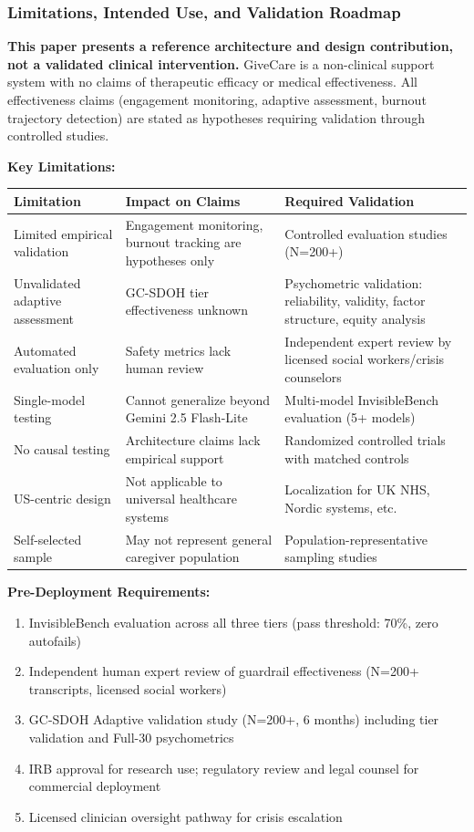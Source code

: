 \documentclass{article}
\begin{document}
\subsubsection{Limitations, Intended Use, and Validation Roadmap}
\textbf{This paper presents a reference architecture and design contribution, not a validated clinical intervention.} GiveCare is a non-clinical support system with no claims of therapeutic efficacy or medical effectiveness. All effectiveness claims (engagement monitoring, adaptive assessment, burnout trajectory detection) are stated as hypotheses requiring validation through controlled studies.

\textbf{Key Limitations:}

\small
\begin{table}[h]
\centering
\begin{tabular}{p{3.5cm}p{5cm}p{5cm}}
\toprule
\textbf{Limitation} & \textbf{Impact on Claims} & \textbf{Required Validation} \\
\midrule
Limited empirical validation & Engagement monitoring, burnout tracking are hypotheses only & Controlled evaluation studies (N=200+) \\
\midrule
Unvalidated adaptive assessment & GC-SDOH tier effectiveness unknown & Psychometric validation: reliability, validity, factor structure, equity analysis \\
\midrule
Automated evaluation only & Safety metrics lack human review & Independent expert review by licensed social workers/crisis counselors \\
\midrule
Single-model testing & Cannot generalize beyond Gemini 2.5 Flash-Lite & Multi-model InvisibleBench evaluation (5+ models) \\
\midrule
No causal testing & Architecture claims lack empirical support & Randomized controlled trials with matched controls \\
\midrule
US-centric design & Not applicable to universal healthcare systems & Localization for UK NHS, Nordic systems, etc. \\
\midrule
Self-selected sample & May not represent general caregiver population & Population-representative sampling studies \\
\bottomrule
\end{tabular}
\end{table}
\normalsize

\textbf{Pre-Deployment Requirements:}

\begin{enumerate}
    \item InvisibleBench evaluation across all three tiers (pass threshold: 70\%, zero autofails)
    \item Independent human expert review of guardrail effectiveness (N=200+ transcripts, licensed social workers)
    \item GC-SDOH Adaptive validation study (N=200+, 6 months) including tier validation and Full-30 psychometrics
    \item IRB approval for research use; regulatory review and legal counsel for commercial deployment
    \item Licensed clinician oversight pathway for crisis escalation
\end{enumerate}
\end{document}
